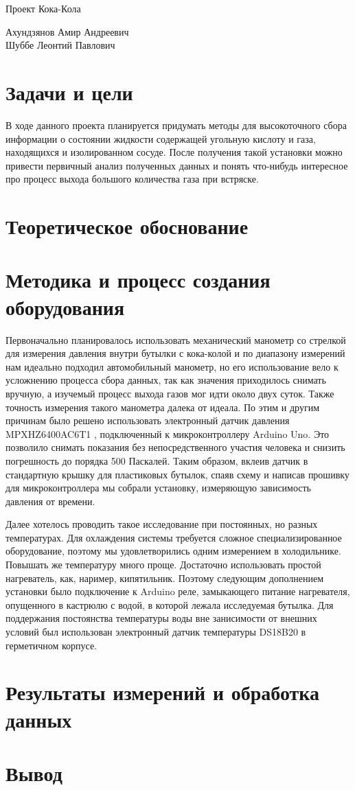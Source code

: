 \documentclass[12pt,a4paper]{scrartcl}
\begin{document}
\begin{center}
\begin{large}
Проект Кока-Кола
\end{large}
	\bigskip
     
Ахундзянов Амир Андреевич\\
Шуббе Леонтий Павлович
\end{center}

\section{Задачи и цели}
В ходе данного проекта планируется придумать методы для высокоточного сбора информации о состоянии жидкости  содержащей угольную кислоту и газа, находящихся и изолированном сосуде. После получения такой установки можно привести первичный анализ полученных данных и понять что-нибудь интересное про процесс выхода большого количества газа при встряске.

\section{Теоретическое обоснование}



\section{Методика и процесс создания оборудования}
Первоначально планировалось использовать механический манометр со стрелкой для измерения давления внутри бутылки с кока-колой и по диапазону измерений нам идеально подходил автомобильный манометр, но его использование вело к усложнению процесса сбора данных, так как значения приходилось снимать вручную, а изучемый процесс выхода газов мог идти около двух суток. Также точность измерения такого манометра далека от идеала. По этим и другим причинам было решено использовать электронный датчик давления MPXHZ6400AC6T1 , подключенный к микроконтроллеру Arduino Uno. Это позволило снимать показания без непосредственного участия человека и снизить погрешность до порядка 500 Паскалей. Таким образом, вклеив датчик в стандартную крышку для пластиковых бутылок, спаяв схему и написав прошивку для микроконтроллера мы собрали установку, измеряющую зависимость давления от времени.

Далее хотелось проводить такое исследование при постоянных, но разных температурах. Для охлаждения системы требуется сложное специализированное оборудование, поэтому мы удовлетворились одним измерением в холодильнике. Повышать же температуру много проще. Достаточно использовать простой нагреватель, как, наример, кипятильник. Поэтому следующим дополнением установки было подключение к Arduino реле, замыкающего питание нагревателя, опущенного в кастрюлю с водой, в которой лежала исследуемая бутылка. Для поддержания постоянства температуры воды вне занисимости от внешних условий был использован электронный датчик температуры DS18B20 в герметичном корпусе. 
\section{Результаты измерений и обработка данных}



\section{Вывод}
\end{document}
